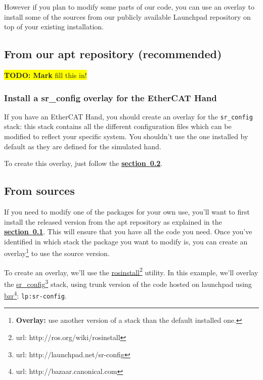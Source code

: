 \documentclass[12pt]{article}
\newcommand{\todo}[1]{\colorbox{yellow}{\textbf{TODO: #1} fill this in!}}
\newcommand{\link}[1]{\hyperref[sec:#1]{\textbf{section~\ref*{sec:#1}}}}
\newcommand{\betterhref}[2]{\href{#1}{#2}\footnote{url: #1}}
\begin{document}
\par However if you plan to modify some parts of our code, you can use an overlay to install some of the sources from our publicly available Launchpad repository on top of your existing installation.

\subsection{From our apt repository (recommended)}
\label{sec:install-apt}
\todo{Mark}

\subsubsection{Install a sr\_config overlay for the EtherCAT Hand}
\label{sec:install-cfg}
\par If you have an EtherCAT Hand, you should create an overlay for the \texttt{sr\_config} stack: this stack contains all the different configuration files which can be modified to reflect your specific system. You shouldn't use the one installed by default as they are defined for the simulated hand.\\

\par To create this overlay, just follow the \link{install-src}.

\subsection{From sources}
\label{sec:install-src}
\par If you need to modify one of the packages for your own use, you'll want to first install the released version from the apt repository as explained in the \link{install-apt}. This will ensure that you have all the code you need. Once you've identified in which stack the package you want to modify is, you can create an overlay\footnote{\textbf{Overlay:} use another version of a stack than the default installed one.} to use the source version.\\

\par To create an overlay, we'll use the \betterhref{http://ros.org/wiki/rosinstall}{rosinstall} utility. In this example, we'll overlay the \betterhref{http://launchpad.net/sr-config}{sr\_config} stack, using trunk version of the code hosted on launchpad using \betterhref{http://bazaar.canonical.com}{bzr}: \texttt{lp:sr-config}.
\end{document}
